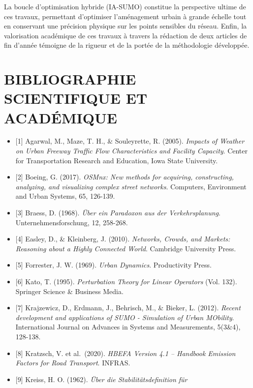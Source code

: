 \documentclass[10pt, a4paper]{article}
\providecommand{\tightlist}{}
\begin{document}
La boucle d'optimisation hybride (IA-SUMO) constitue la perspective
ultime de ces travaux, permettant d'optimiser l'aménagement urbain à
grande échelle tout en conservant une précision physique sur les points
sensibles du réseau. Enfin, la valorisation académique de ces travaux à
travers la rédaction de deux articles de fin d'année témoigne de la
rigueur et de la portée de la méthodologie développée.

\newpage

\section{BIBLIOGRAPHIE SCIENTIFIQUE ET
ACADÉMIQUE}\label{bibliographie-scientifique-et-acaduxe9mique}

\begin{itemize}
\tightlist
\item
  {[}1{]} Agarwal, M., Maze, T. H., \& Souleyrette, R. (2005).
  \emph{Impacts of Weather on Urban Freeway Traffic Flow Characteristics
  and Facility Capacity}. Center for Transportation Research and
  Education, Iowa State University.
\item
  {[}2{]} Boeing, G. (2017). \emph{OSMnx: New methods for acquiring,
  constructing, analyzing, and visualizing complex street networks}.
  Computers, Environment and Urban Systems, 65, 126-139.
\item
  {[}3{]} Braess, D. (1968). \emph{Über ein Paradoxon aus der
  Verkehrsplanung}. Unternehmensforschung, 12, 258-268.
\item
  {[}4{]} Easley, D., \& Kleinberg, J. (2010). \emph{Networks, Crowds,
  and Markets: Reasoning about a Highly Connected World}. Cambridge
  University Press.
\item
  {[}5{]} Forrester, J. W. (1969). \emph{Urban Dynamics}. Productivity
  Press.
\item
  {[}6{]} Kato, T. (1995). \emph{Perturbation Theory for Linear
  Operators} (Vol. 132). Springer Science \& Business Media.
\item
  {[}7{]} Krajzewicz, D., Erdmann, J., Behrisch, M., \& Bieker, L.
  (2012). \emph{Recent development and applications of SUMO - Simulation
  of Urban MObility}. International Journal on Advances in Systems and
  Measurements, 5(3\&4), 128-138.
\item
  {[}8{]} Kratzsch, V. et al.~(2020). \emph{HBEFA Version 4.1 --
  Handbook Emission Factors for Road Transport}. INFRAS.
\item
  {[}9{]} Kreiss, H. O. (1962). \emph{Über die Stabilitätsdefinition für
}
\end{itemize}
\end{document}
